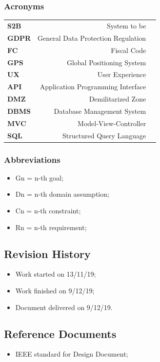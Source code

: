 \documentclass[titlepage]{article}
\begin{document}
\subsubsection{Acronyms}
\begin{tabular}{|l|rl|}
\hline

\textbf{S2B}	& System to be 	&				 			 \\
\textbf{GDPR}	& General Data Protection Regulation &	     \\
\textbf{FC}     & Fiscal Code    	&	 				 \\
\textbf{GPS}    & Global Positioning System &	 			 \\
\textbf{UX}		& User Experience & 
\\
\textbf{API}	& Application Programming Interface &
\\

\textbf{DMZ}	& Demilitarized Zone & 
\\
\textbf{DBMS}	& Database Management System &
\\
\textbf{MVC}	& Model-View-Controller &
\\
\textbf{SQL}	& Structured Query Language &
\\
\hline
\end{tabular}
\subsubsection{Abbreviations}
\begin{itemize}
	\item Gn = n-th goal;
	\item Dn = n-th domain assumption;
	\item Cn = n-th constraint;
	\item Rn = n-th requirement;
\end{itemize}
\subsection{Revision History}
\begin{itemize}
\item Work started on 13/11/19;
\item Work finished on 9/12/19;
\item Document delivered on 9/12/19.
\end{itemize}
\subsection{Reference Documents}
\begin{itemize}
\item IEEE standard for Design Document;
\end{itemize}
\end{document}
